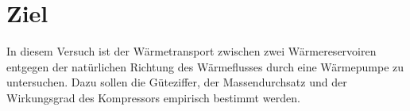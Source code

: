 \section{Ziel}
\label{sec:Ziel}
In diesem Versuch ist der Wärmetransport zwischen zwei Wärmereservoiren entgegen
der natürlichen Richtung des Wärmeflusses durch eine Wärmepumpe zu untersuchen.
Dazu sollen die Güteziffer, der Massendurchsatz und der Wirkungsgrad des Kompressors
empirisch bestimmt werden.
